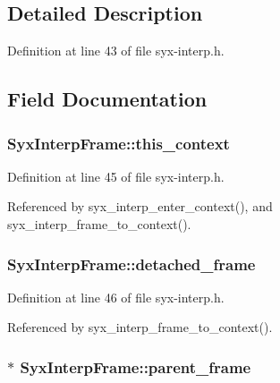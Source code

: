 \subsection{Detailed Description}


Definition at line 43 of file syx-interp.h.

\subsection{Field Documentation}
\hypertarget{struct_syx_interp_frame_37d33bf761d4f34c55da10cbf9d3df63}{
\subsubsection{ {\bf SyxInterpFrame::this\_\-context}}}
\label{struct_syx_interp_frame_37d33bf761d4f34c55da10cbf9d3df63}




Definition at line 45 of file syx-interp.h.

Referenced by syx\_\-interp\_\-enter\_\-context(), and syx\_\-interp\_\-frame\_\-to\_\-context().\hypertarget{struct_syx_interp_frame_f3ecaeed999a18d99d3fd27e9450ab41}{
\subsubsection{ {\bf SyxInterpFrame::detached\_\-frame}}}
\label{struct_syx_interp_frame_f3ecaeed999a18d99d3fd27e9450ab41}




Definition at line 46 of file syx-interp.h.

Referenced by syx\_\-interp\_\-frame\_\-to\_\-context().\hypertarget{struct_syx_interp_frame_e1b68af7dec8776cd14b3d1df923409c}{
\subsubsection{$\ast$ {\bf SyxInterpFrame::parent\_\-frame}}}
\label{struct_syx_interp_frame_e1b68af7dec8776cd14b3d1df923409c}




